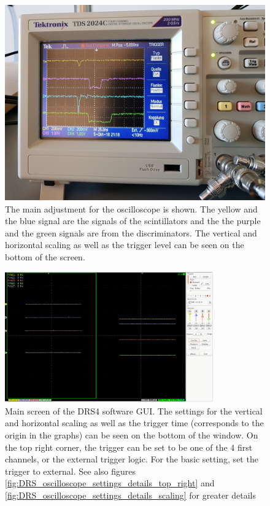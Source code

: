 \documentclass[12pt]{article}
\begin{document}
\begin{figure}[H]
    \centering
    \includegraphics[width = 13cm]{pics/oscilloscope.jpg}
    \caption{\small The main adjustment for the oscilloscope is shown. The yellow and the blue signal are the signals of the scintillators and the the purple and the green signals are from the discriminators. The vertical and horizontal scaling as well as the trigger level can be seen on the bottom of the screen.}
    \label{fig:oscilloscope}
\end{figure}
\begin{figure}[H]
    \centering
    \includegraphics[width = 9cm]{pics/DRS_oscilloscope_settings.png}
    \caption{\small Main screen of the DRS4 software GUI. The settings for the vertical and horizontal scaling as well as the trigger time (corresponds to the origin in the graphs) can be seen on the bottom of the window. On the top right corner, the trigger can be set to be one of the 4 first channels, or the external trigger logic. For the basic setting, set the trigger to external. See also figures \ref{fig:DRS_oscilloscope_settings_details_top_right} and \ref{fig:DRS_oscilloscope_settings_details_scaling} for greater details}
    \label{fig:DRS_oscilloscope_settings}
\end{figure}
\end{document}

